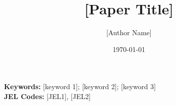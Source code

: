 \documentclass[12pt]{article}
\title{[Paper Title]}
\author{[Author Name]\\[Institution]}
\date{\today}
\begin{document}
\maketitle

\begin{abstract}

\end{abstract}

\noindent\textbf{Keywords:} [keyword 1]; [keyword 2]; [keyword 3]\\
\textbf{JEL Codes:} [JEL1], [JEL2]

\clearpage








\clearpage


\end{document}
